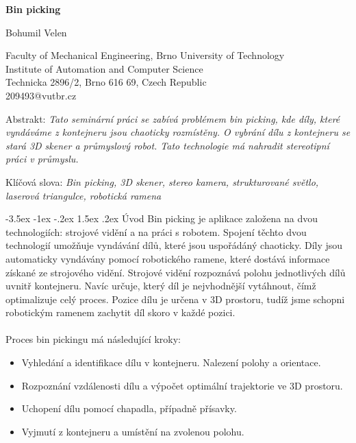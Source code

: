 \documentclass[a4paper,11pt]{article}
\makeatletter
\theoremstyle{definition}
\renewcommand\section{\@startsection {section}{1}{\z@}%
                                   {-3.5ex \@plus -1ex \@minus -.2ex}%
                                   {1.5ex \@plus.2ex}%
                                   {\large\bfseries}}
\makeatother
\begin{document}
\pagestyle{empty}

\begin{center}
{\bf \Large Bin picking}
\end{center}

\smallskip
\begin{center}
{\large Bohumil Velen}
\end{center}

\smallskip
\begin{center}
Faculty of Mechanical Engineering, Brno University of Technology\\
Institute of Automation and Computer Science\\
Technicka 2896/2, Brno 616 69, Czech Republic\\
209493@vutbr.cz\\
\end{center}

\bigskip
\noindent Abstrakt: \textit{Tato seminární práci se zabívá problémem bin picking, kde díly, které vyndáváme z kontejneru jsou chaoticky rozmístěny. O vybrání dílu z kontejneru se stará 3D skener a průmyslový robot. Tato technologie má nahradit stereotipní práci v průmyslu.}

\vspace*{10pt} \noindent Klíčová slova: \textit{Bin picking, 3D skener, stereo kamera, strukturované světlo, laserová triangulce, robotická ramena}

\bigskip
\section{Úvod}
\label{sec:1}
Bin picking je aplikace založena na dvou technologiích: strojové vidění a na práci s robotem. Spojení těchto dvou technologií umožňuje vyndávání dílů, které jsou uspořádáný chaoticky. Díly jsou automaticky vyndávány pomocí robotického ramene, které dostává informace získané ze strojového vidění. Strojové vidění rozpoznává polohu jednotlivých dílů uvnitř kontejneru. Navíc určuje, který díl je nejvhodnější vytáhnout, čímž optimalizuje celý proces. Pozice dílu je určena v 3D prostoru, tudíž jsme schopni robotickým ramenem zachytit díl skoro v každé pozici. \cite{6415038} 
\\
\\Proces bin pickingu má následující kroky:

\begin{itemize}
\item Vyhledání a identifikace dílu v kontejneru. Nalezení polohy a orientace.
\item Rozpoznání vzdálenosti dílu a výpočet optimální trajektorie ve 3D prostoru.
\item Uchopení dílu pomocí chapadla, případně přísavky. 
\item Vyjmutí z kontejneru a umístění na zvolenou polohu.
\end{itemize}
\end{document}
